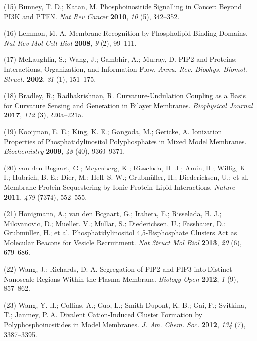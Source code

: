 \documentclass[11pt,notitlepage]{article}
\begin{document}
\leavevmode\hypertarget{ref-1DCzqvykg}{}%
(15) Bunney, T. D.; Katan, M. Phosphoinositide Signalling in Cancer:
Beyond PI3K and PTEN. \emph{Nat Rev Cancer} \textbf{2010}, \emph{10}
(5), 342--352.

\leavevmode\hypertarget{ref-uyKE7bWV}{}%
(16) Lemmon, M. A. Membrane Recognition by Phospholipid-Binding Domains.
\emph{Nat Rev Mol Cell Biol} \textbf{2008}, \emph{9} (2), 99--111.

\leavevmode\hypertarget{ref-3EmJ4esY}{}%
(17) McLaughlin, S.; Wang, J.; Gambhir, A.; Murray, D. PIP2 and
Proteins: Interactions, Organization, and Information Flow. \emph{Annu.
Rev. Biophys. Biomol. Struct.} \textbf{2002}, \emph{31} (1), 151--175.

\leavevmode\hypertarget{ref-5PUA7pLD}{}%
(18) Bradley, R.; Radhakrishnan, R. Curvature-Undulation Coupling as a
Basis for Curvature Sensing and Generation in Bilayer Membranes.
\emph{Biophysical Journal} \textbf{2017}, \emph{112} (3), 220a--221a.

\leavevmode\hypertarget{ref-8pFCG7HG}{}%
(19) Kooijman, E. E.; King, K. E.; Gangoda, M.; Gericke, A. Ionization
Properties of Phosphatidylinositol Polyphosphates in Mixed Model
Membranes. \emph{Biochemistry} \textbf{2009}, \emph{48} (40),
9360--9371.

\leavevmode\hypertarget{ref-U2YHSNKE}{}%
(20) van den Bogaart, G.; Meyenberg, K.; Risselada, H. J.; Amin, H.;
Willig, K. I.; Hubrich, B. E.; Dier, M.; Hell, S. W.; Grubmüller, H.;
Diederichsen, U.; et al. Membrane Protein Sequestering by Ionic
Protein--Lipid Interactions. \emph{Nature} \textbf{2011}, \emph{479}
(7374), 552--555.

\leavevmode\hypertarget{ref-Gw4f4Ayu}{}%
(21) Honigmann, A.; van den Bogaart, G.; Iraheta, E.; Risselada, H. J.;
Milovanovic, D.; Mueller, V.; Müllar, S.; Diederichsen, U.; Fasshauer,
D.; Grubmüller, H.; et al. Phosphatidylinositol 4,5-Bisphosphate
Clusters Act as Molecular Beacons for Vesicle Recruitment. \emph{Nat
Struct Mol Biol} \textbf{2013}, \emph{20} (6), 679--686.

\leavevmode\hypertarget{ref-rvpDeSHJ}{}%
(22) Wang, J.; Richards, D. A. Segregation of PIP2 and PIP3 into
Distinct Nanoscale Regions Within the Plasma Membrane. \emph{Biology
Open} \textbf{2012}, \emph{1} (9), 857--862.

\leavevmode\hypertarget{ref-LhOwGz4k}{}%
(23) Wang, Y.-H.; Collins, A.; Guo, L.; Smith-Dupont, K. B.; Gai, F.;
Svitkina, T.; Janmey, P. A. Divalent Cation-Induced Cluster Formation by
Polyphosphoinositides in Model Membranes. \emph{J. Am. Chem. Soc.}
\textbf{2012}, \emph{134} (7), 3387--3395.
\end{document}
